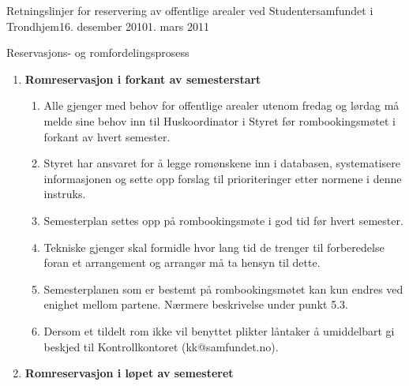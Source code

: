 \begin{instruks}{Retningslinjer for reservering av offentlige arealer
    ved Studentersamfundet i Trondhjem}{16. desember 2010}{1. mars 2011}
\begin{instruksledd}{Reservasjons- og romfordelingsprosess}
        \begin{enumerate}
            \item \textbf{Romreservasjon i forkant av semesterstart}
                \begin{enumerate}
                    \item Alle gjenger med behov for offentlige arealer utenom fredag
                        og lørdag må melde sine behov inn til
                        Huskoordinator i Styret før rombookingsmøtet i forkant av hvert
                        semester.
                    \item Styret har ansvaret for å legge romønskene inn i databasen,
                        systematisere informasjonen og sette opp forslag til
                        prioriteringer etter normene i denne instruks.
                    \item Semesterplan settes opp på rombookingsmøte i god tid før
                        hvert semester.
                    \item Tekniske gjenger skal formidle hvor lang tid de trenger til
                        forberedelse foran et arrangement og arrangør må
                        ta hensyn til dette.
                    \item Semesterplanen som er bestemt på rombookingsmøtet kan kun
                        endres ved enighet mellom partene. Nærmere
                        beskrivelse under punkt 5.3.
                    \item Dersom et tildelt rom ikke vil benyttet plikter låntaker å
                        umiddelbart gi beskjed til Kontrollkontoret
                        (kk@samfundet.no).
                \end{enumerate}

            \item \textbf{Romreservasjon i løpet av semesteret}


\end{enumerate}
\end{instruksledd}
\end{instruks}
